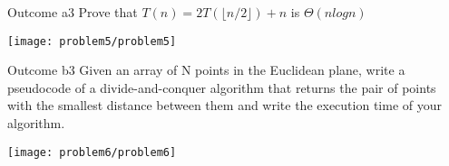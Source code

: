 \begin{problem}{Outcome a}{3}
    Prove that $T(n) = 2T(\lfloor n/2 \rfloor) + n$ is $\Theta(nlogn)$
    \begin{center}
        \texttt{[image: problem5/problem5]}%
    \end{center}
\end{problem}

\begin{problem}{Outcome b}{3}
    Given an array of N points in the Euclidean plane, write a pseudocode of a divide-and-conquer algorithm that returns the pair of points with the smallest distance between them and write the execution time of your algorithm.
    \begin{center}
        \texttt{[image: problem6/problem6]}%
    \end{center}
\end{problem}





